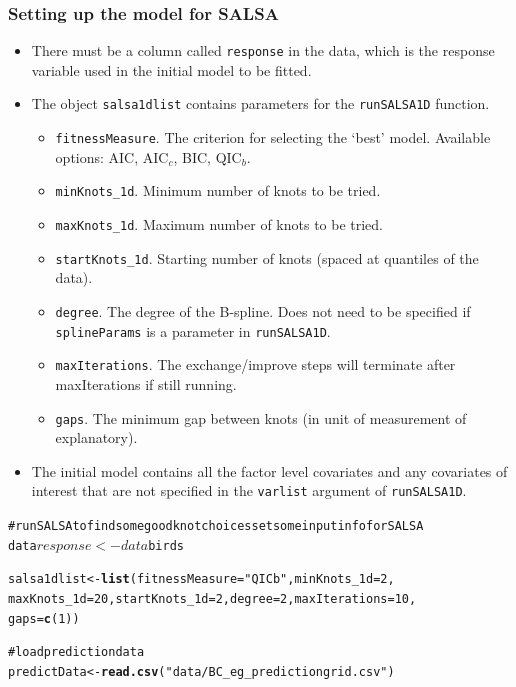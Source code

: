 \documentclass[11pt, a4paper]{article}
\makeatletter
\newcommand{\hlfunctioncall}[1]{\textcolor[rgb]{0.501960784313725,0,0.329411764705882}{\textbf{#1}}}%
\newcommand{\hlstring}[1]{\textcolor[rgb]{0.6,0.6,1}{#1}}%
\newcommand{\hlcomment}[1]{\textcolor[rgb]{0.180392156862745,0.6,0.341176470588235}{#1}}%
\newenvironment{kframe}{%
 \def\at@end@of@kframe{}%
 \ifinner\ifhmode%
  \def\at@end@of@kframe{\end{minipage}}%
  \begin{minipage}{\columnwidth}%
 \fi\fi%
 \def\FrameCommand##1{\hskip\@totalleftmargin \hskip-\fboxsep
 \colorbox{shadecolor}{##1}\hskip-\fboxsep
     \hskip-\linewidth \hskip-\@totalleftmargin \hskip\columnwidth}%
 \MakeFramed {\advance\hsize-\width
   \@totalleftmargin\z@ \linewidth\hsize
   \@setminipage}}%
 {\par\unskip\endMakeFramed%
 \at@end@of@kframe}
\newenvironment{knitrout}{}{} %
\makeatother
\begin{document}
\begin{frame}[fragile]
\frametitle{Setting up the model for SALSA}
\begin{itemize}
\item There must be a column called {\tt response} in the data, which is the response variable used in the initial model to be fitted.
\item The object {\tt salsa1dlist} contains parameters for the {\tt runSALSA1D} function.  
\begin{itemize}
\item {\tt fitnessMeasure}. The criterion for selecting the `best' model.  Available options: AIC, AIC$_c$, BIC, QIC$_b$.
\item {\tt minKnots\_1d}. Minimum number of knots to be tried.
\item {\tt maxKnots\_1d}. Maximum number of knots to be tried.
\item {\tt startKnots\_1d}. Starting number of knots (spaced at quantiles of the data).
\item {\tt degree}. The degree of the B-spline. Does not need to be specified if {\tt splineParams} is a parameter in {\tt runSALSA1D}.
\item {\tt maxIterations}. The exchange/improve steps will terminate after maxIterations if still running.
\item {\tt gaps}. The minimum gap between knots (in unit of measurement of explanatory).
\end{itemize}
\item The initial model contains all the factor level covariates and any covariates of interest that are not specified in the {\tt varlist} argument of {\tt runSALSA1D}.
\end{itemize}


\begin{knitrout}\footnotesize
{}\color{fgcolor}\begin{kframe}
\begin{alltt}
\hlcomment{# run SALSA to find some good knot choices set some input info for SALSA}
data$response <- data$birds

salsa1dlist <- \hlfunctioncall{list}(fitnessMeasure = \hlstring{"QICb"}, minKnots_1d = 2, 
    maxKnots_1d = 20, startKnots_1d = 2, degree = 2, maxIterations = 10, 
    gaps = \hlfunctioncall{c}(1))

\hlcomment{# load prediction data}
predictData <- \hlfunctioncall{read.csv}(\hlstring{"data/BC_eg_predictiongrid.csv"})


\end{alltt}
\end{kframe}
\end{knitrout}
\end{frame}
\end{document}
